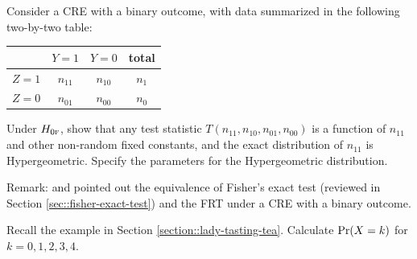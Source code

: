 \begin{HomeworkProblem}\label{exr:3-4}

Consider a CRE with a binary outcome, with data summarized in the following two-by-two table:
 \begin{center}
\begin{tabular}{lccc}
\hline
        & $Y =1$ & $Y =0$& total\\\hline
$Z =1$ & $n_{11}$ & $n_{10}$ & $n_1$\\
$Z =0$ & $n_{01}$ & $n_{00}$ & $n_0$\\
\hline
\end{tabular}
\end{center}
Under $H_{0\textsc{f}}$, show that any test statistic $T(n_{11}, n_{10}, n_{01}, n_{00})$ is a function of $n_{11}$ and other non-random fixed constants, and the exact distribution of $n_{11}$ is Hypergeometric. Specify the parameters for the Hypergeometric distribution.

Remark:
\citet{barnard1947significance} and \citet{Ding:2015} pointed out the equivalence of Fisher's exact test (reviewed in Section \ref{sec::fisher-exact-test}) and the FRT under a CRE  with a binary outcome.





\end{HomeworkProblem}

\begin{HomeworkProblem}\label{exr:3-5}

Recall the example in Section \ref{section::lady-tasting-tea}. Calculate $\operatorname{Pr}(X=k)$ for $k=0,1,2,3,4$.


\end{HomeworkProblem}

